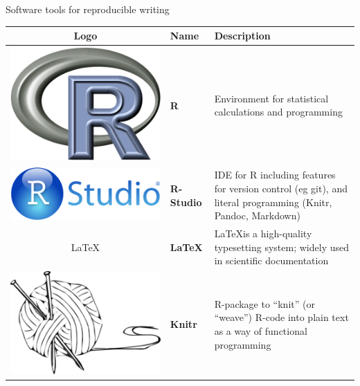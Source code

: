 \documentclass[final,hyperref={pdfpagelabels=false}]{beamer}
\begin{document}
\begin{frame}{}
\begin{columns}[t]
\begin{column}{.48\linewidth}
\begin{block}{Software tools for reproducible writing}
\begin{tabulary}{1.0\textwidth}{CLL}
  \hline
 Logo  & Name & Description  \\ 
 \hline
\includegraphics[valign=T,scale=.2]{logo/R_logo} & \textbf{R }& Environment for statistical calculations and programming \cite{RCoreTeam2015}\\
 \includegraphics[valign=T,scale=.08]{logo/RStudio_logo} &  \textbf{R-Studio} & IDE for R including features for version control (eg git), and literal programming (Knitr, Pandoc, Markdown)\\
 \LaTeX & \textbf{LaTeX} & \LaTeX is a high-quality typesetting system; widely used in scientific documentation\\
 \includegraphics[valign=T, scale=.5]{logo/knitr_logo} &  \textbf{Knitr} & R-package to ``knit'' (or ``weave'') R-code into plain text as a way of functional programming \cite{Xie2016}\\

\end{tabulary}
\end{block}
\end{column}
\end{columns}
\end{frame}
\end{document}
